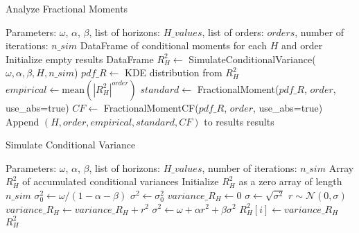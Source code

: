\begin{center}
\begin{minipage}{0.9 \textwidth}
\begin{algorithm}[H]
\caption{Analyze Fractional Moments}
\label{alg:analyse_fractional_moments}
\begin{algorithmic}[1]
\REQUIRE Parameters: $\omega$, $\alpha$, $\beta$, list of horizons: $H\_values$, list of orders: $orders$, number of iterations: $n\_sim$
\ENSURE DataFrame of conditional moments for each $H$ and order
\STATE Initialize empty results DataFrame
    \STATE $R_{H}^{2} \leftarrow$ SimulateConditionalVariance($\omega, \alpha, \beta, H, n\_sim$)
    \STATE $pdf\_R \leftarrow$ KDE distribution from $R_H^2$
        \STATE $empirical \leftarrow \text{mean}(|R_H^2|^{order})$
        \STATE $standard \leftarrow$ FractionalMoment($pdf\_R$, $order$, use\_abs=true)
        \STATE $CF \leftarrow$ FractionalMomentCF($pdf\_R$, $order$, use\_abs=true)
        \STATE Append $(H, order, empirical, standard, CF)$ to results
    \ENDFOR
\ENDFOR
\RETURN results
\end{algorithmic}
\end{algorithm}
\end{minipage}
\end{center}

\begin{center}
\begin{minipage}{0.9 \textwidth}
\begin{algorithm}[H]
\caption{Simulate Conditional Variance}
\label{alg:simulate_conditional_variance}
\begin{algorithmic}[1]
\REQUIRE Parameters: $\omega$, $\alpha$, $\beta$, list of horizons: $H\_values$, number of iterations: $n\_sim$
\ENSURE Array $R_H^2$ of accumulated conditional variances
\STATE Initialize $R_H^2$ as a zero array of length $n\_sim$
\STATE $\sigma_0^2 \leftarrow \omega / (1 - \alpha - \beta)$
    \STATE $\sigma^2 \leftarrow \sigma_0^2$
    \STATE $variance\_R_H \leftarrow 0$
        \STATE $\sigma \leftarrow \sqrt{\sigma^2}$
        \STATE $r \sim \mathcal{N}(0, \sigma)$
        \STATE $variance\_R_H \leftarrow variance\_R_H + r^2$
        \STATE $\sigma^2 \leftarrow \omega + \alpha r^2 + \beta \sigma^2$
    \ENDFOR
    \STATE $R_H^2[i] \leftarrow variance\_R_H$
\ENDFOR
\RETURN $R_H^2$
\end{algorithmic}
\end{algorithm}
\end{minipage}
\end{center}


